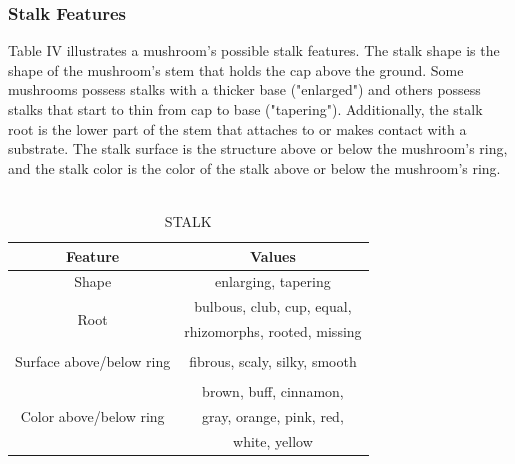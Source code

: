\documentclass[11pt, conference]{IEEEtran}
\begin{document}
    \subsubsection{Stalk Features}
    Table IV illustrates a mushroom's possible stalk features. The stalk shape is the shape of the mushroom's stem that holds the cap above the ground. Some mushrooms possess stalks with a thicker base ("enlarged") and others possess stalks that start to thin from cap to base ("tapering"). Additionally, the stalk root is the lower part of the stem that attaches to or makes contact with a substrate. The stalk surface is the structure above or below the mushroom's ring, and the stalk color is the color of the stalk above or below the mushroom's ring.
    \begin{table}[htbp]
        \centering
        \caption{\\ STALK}
        \begin{tabular}{cc} \toprule
                \textbf{Feature} & \textbf{Values} \\
            \midrule
                \multirow{1}{5em}{Shape}
                    & enlarging, tapering  \\
            \midrule
                \multirow{2}{5em}{Root}
                    & bulbous, club, cup, equal,   \\
                    & rhizomorphs, rooted, missing \\
            \midrule
                \multirow{3}{5em}{Surface above/below ring}
                    & \\
                    & fibrous, scaly, silky, smooth \\
                    & \\
            \midrule
                \multirow{3}{5em}{Color above/below ring}
                    & brown, buff, cinnamon,   \\
                    & gray, orange, pink, red, \\
                    & white, yellow            \\
            \bottomrule
        \end{tabular}
    \end{table}
    
\end{document}
